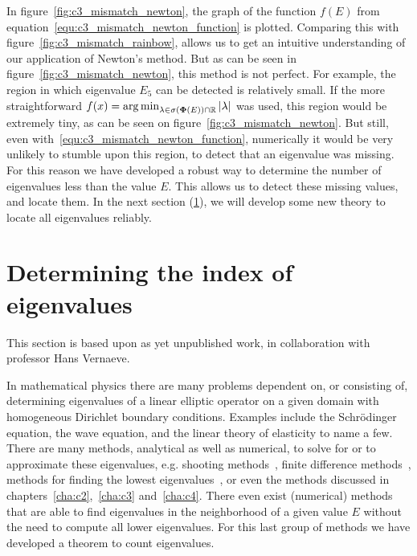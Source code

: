 In figure~\ref{fig:c3_mismatch_newton}, the graph of the function $f(E)$ from equation~\eqref{equ:c3_mismatch_newton_function} is plotted. Comparing this with figure~\ref{fig:c3_mismatch_rainbow}, allows us to get an intuitive understanding of our application of Newton's method. But as can be seen in figure~\ref{fig:c3_mismatch_newton}, this method is not perfect. For example, the region in which eigenvalue $E_5$ can be detected is relatively small. If the more straightforward $f(x) = \operatorname*{arg\,min}_{\lambda \in \operatorname{\sigma}(\vb{\Phi}(E)) \cap \mathbb{R}} \left|\lambda\right|$ was used, this region would be extremely tiny, as can be seen on figure~\ref{fig:c3_mismatch_newton}. But still, even with~\eqref{equ:c3_mismatch_newton_function}, numerically it would be very unlikely to stumble upon this region, to detect that an eigenvalue was missing. For this reason we have developed a robust way to determine the number of eigenvalues less than the value $E$. This allows us to detect these missing values, and locate them. In the next section (\ref{sec:c3_index_of_e}), we will develop some new theory to locate all eigenvalues reliably.

\section{Determining the index of eigenvalues}\label{sec:c3_index_of_e}

This section is based upon as yet unpublished work, in collaboration with professor Hans Vernaeve.

In mathematical physics there are many problems dependent on, or consisting of, determining eigenvalues of a linear elliptic operator on a given domain with homogeneous Dirichlet boundary conditions. Examples include the Schrödinger equation, the wave equation, and the linear theory of elasticity to name a few. There are many methods, analytical as well as numerical, to solve for or to approximate these eigenvalues, e.g. shooting methods~\cite{ixaru_numerical_1984,ixaru_new_2010}, finite difference methods~\cite{wang_new_2009}, methods for finding the lowest eigenvalues~\cite{braun_efficient_1996}, or even the methods discussed in chapters~\ref{cha:c2},~\ref{cha:c3} and~\ref{cha:c4}. There even exist (numerical) methods that are able to find eigenvalues in the neighborhood of a given value $E$ without the need to compute all lower eigenvalues. For this last group of methods we have developed a theorem to count eigenvalues.

